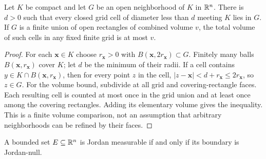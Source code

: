 \begin{lemma}
\label{lem:fine-grid-boundary}
Let $K$ be compact and let $G$ be an open neighborhood of $K$ in
$\mathbb{R}^n$. There is $d>0$ such that every closed grid cell of diameter
less than $d$ meeting $K$ lies in $G$. If $G$ is a finite union of
open rectangles of combined volume $v$, the total volume of such cells
in any fixed finite grid is at most $v$.
\end{lemma}
\begin{proof}
For each $\mathbf{x}\in K$ choose $r_{\mathbf{x}}>0$ with $B(\mathbf{x},2r_{\mathbf{x}})\subset G$.
Finitely many balls $B(\mathbf{x},r_{\mathbf{x}})$ cover $K$; let $d$ be the minimum of
their radii. If a cell contains $y\in K\cap B(\mathbf{x},r_{\mathbf{x}})$, then for every
point $z$ in the cell, $|z-\mathbf{x}|<d+r_{\mathbf{x}}\leq2r_{\mathbf{x}}$, so $z\in G$.
For the volume bound, subdivide at all grid and covering-rectangle faces.
Each resulting cell is counted at most once in the grid union and at
least once among the covering rectangles. Adding its elementary volume
gives the inequality. This is a finite volume comparison, not an
assumption that arbitrary neighborhoods can be refined by their faces.
\end{proof}
\begin{proposition}
\label{prop:jordan-boundary-criterion}
A bounded set \(E\subseteq\mathbb{R}^n\) is Jordan measurable if and only if its
boundary is Jordan-null.
\end{proposition}

